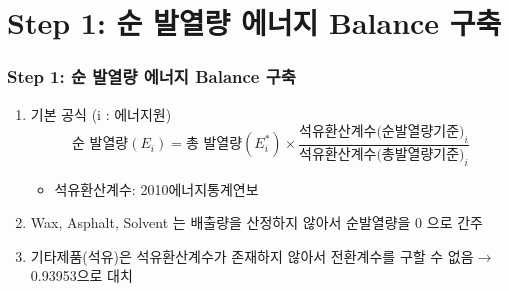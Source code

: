 \documentclass[10pt,compress,slidetop,%
			   hyperref={unicode},xcolor={svgnames},%
			   t]{beamer}
\begin{document}
\section{Step 1: 순 발열량 에너지 Balance 구축}
%
\begin{frame}
	\frametitle{Step 1: 순 발열량 에너지 Balance 구축}
	\begin{enumerate}
	\item{기본 공식 (i : 에너지원)}
	\begin{displaymath}
	\mbox{순 발열량} (E_i) =\mbox{총 발열량} (E^*_i) \times\frac{\mbox{석유환산계수(순발열량기준)}_i}{\mbox{석유환산계수(총발열량기준)}_i}
	\end{displaymath}
		\begin{itemize}
		\item{석유환산계수: 2010에너지통계연보}
		\end{itemize}
	\item{ Wax, Asphalt, Solvent 는 배출량을 산정하지 않아서 순발열량을 0 으로 간주}
    \bigskip
	\item{ 기타제품(석유)은 석유환산계수가 존재하지 않아서 전환계수를 구할 수 없음$\rightarrow$ 0.93953으로 대치}
	\end{enumerate}
	
	
\end{frame}

%
\end{document}
